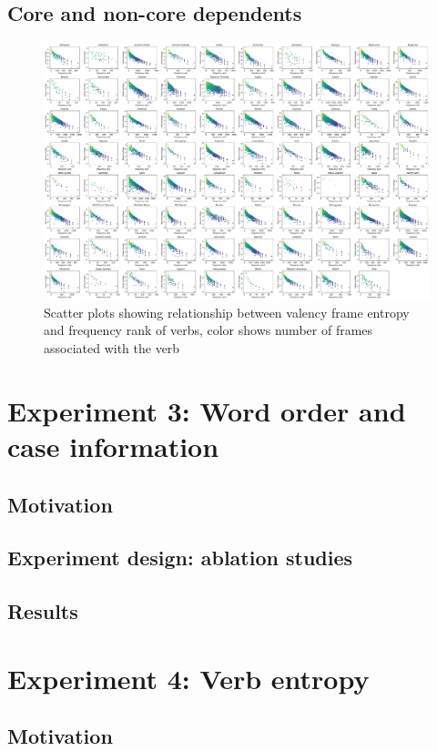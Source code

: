 \subsection{Core and non-core dependents}



\begin{figure}
  \centering
  \includegraphics[width=\textwidth]{figures/joint_entropy_freq.pdf}
  \caption{Scatter plots showing relationship between valency frame entropy and frequency rank of verbs, color shows number of frames associated with the verb}
  \label{fig:joint_entropy_freq}
\end{figure}

\section{Experiment 3: Word order and case information}
\subsection{Motivation}
\subsection{Experiment design: ablation studies}
\subsection{Results}

\section{Experiment 4: Verb entropy}
\subsection{Motivation}
